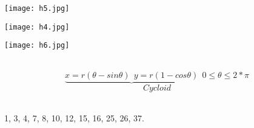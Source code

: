 
\underline{\large\textbf{\color{smalt(darkpowderblue)}{Cycloid}}}
\noindent\begin{minipage}{0.3\textwidth}
\texttt{[image: h5.jpg]}
\end{minipage}
\noindent\begin{minipage}{0.3\textwidth}
\texttt{[image: h4.jpg]}
\end{minipage}
\noindent\begin{minipage}{0.3\textwidth}
\texttt{[image: h6.jpg]}
\end{minipage}\\
\hspace*{1.8cm}$$\underbrace{x=r(\theta-sin\theta)~~y=r(1-cos\theta)}~ ~0 \leq \theta \leq 2*\pi$$
$$Cycloid$$\\
\noindent{\color{smalt(darkpowderblue)}\rule{\linewidth}{.2mm}}
\begin{problem}
1, 3, 4, 7, 8, 10, 12, 15, 16, 25, 26, 37.
\end{problem}
